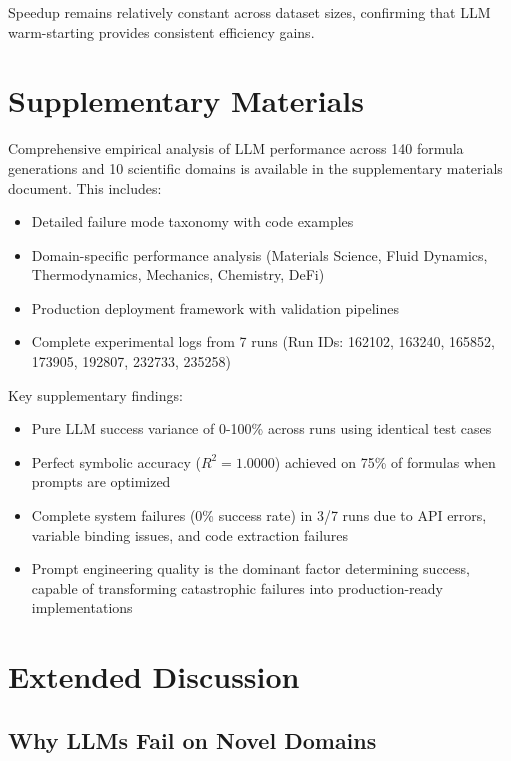 Speedup remains relatively constant across dataset sizes, confirming that LLM warm-starting provides consistent efficiency gains.


\section*{Supplementary Materials}

Comprehensive empirical analysis of LLM performance across 140 formula generations and 10 scientific domains is available in the supplementary materials document. This includes:

\begin{itemize}
\item Detailed failure mode taxonomy with code examples
\item Domain-specific performance analysis (Materials Science, Fluid Dynamics, Thermodynamics, Mechanics, Chemistry, DeFi)
\item Production deployment framework with validation pipelines
\item Complete experimental logs from 7 runs (Run IDs: 162102, 163240, 165852, 173905, 192807, 232733, 235258)
\end{itemize}

Key supplementary findings:
\begin{itemize}
\item Pure LLM success variance of 0-100\% across runs using identical test cases
\item Perfect symbolic accuracy ($R^2 = 1.0000$) achieved on 75\% of formulas when prompts are optimized
\item Complete system failures (0\% success rate) in 3/7 runs due to API errors, variable binding issues, and code extraction failures
\item Prompt engineering quality is the dominant factor determining success, capable of transforming catastrophic failures into production-ready implementations
\end{itemize}

\section{Extended Discussion}
\label{app:extended_discussion}

\subsection{Why LLMs Fail on Novel Domains}

